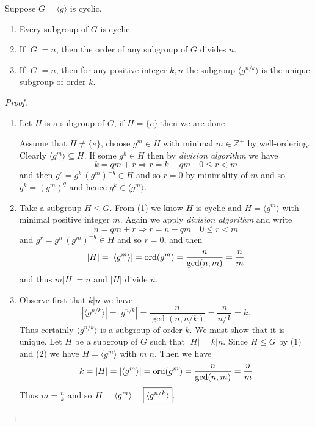 \begin{theorem}
    Suppose $G = \langle g \rangle$ is cyclic.
    \begin{enumerate}
        \item Every subgroup of $G$ is cyclic.
        \item If $|G|=n$, then the order of any subgroup of $G$ divides $n$.
        \item If $|G|=n$, then for any positive integer $k,n$ the subgroup $\langle g^{n/k} \rangle$ 
        is the unique subgroup of order $k$.
    \end{enumerate}
\end{theorem}
\begin{proof}
    \begin{enumerate}
        \item Let $H$ is a subgroup of $G$, if $H = \{ e \}$ then we are done. 
        
        Assume that $H \neq \{ e\}$, choose $g^m \in H$ with minimal $m \in \mathbb{Z}^+$ by well-ordering.
        Clearly $\langle g^m \rangle \subseteq H$. If some $g^k \in H$ then by \textit{division algorithm} we have 
        \[
            k = qm + r \Longrightarrow r = k - qm \quad 0 \leq r < m
        \] 
        and then $g^r = g^k\, (g^m)^{-q} \in H$ and so $r = 0$ by minimality of $m$ and so 
        $g^k = (g^m)^q$ and hence $g^k \in \langle g^m \rangle$.

        \item Take a subgroup $H \leq G$. From (1) we know $H$ is cyclic and $H =\langle g^m \rangle$ with minimal positive integer $m$.
        Again we apply \textit{division algorithm} and write 
        \[
            n = qm + r \Longrightarrow r = n - qm \quad 0 \leq r < m
        \]
        and $g^r = g^n\, (g^m)^{-q} \in H$ and so $r = 0$, and then 
        \[
            |H| = |\langle g^m \rangle| = \operatorname{ord}(g^m) = \frac{n}{\gcd(n,m)} = \frac{n}{m}
        \]
        and thus $m|H| = n$ and $|H|$ divide $n$.

        \item Observe first that $k | n$ we have 
        \[
            |\langle g^{n/k} \rangle| = |g^{n/k}| = \frac{n}{\gcd(n, n/k)} = \frac{n}{n/k} = k.
        \]
        Thus certainly $\langle g^{n/k} \rangle$ is a subgroup of order $k$. We must show that it is unique. Let 
        $H$ be a subgroup of $G$ such that $|H| = k | n$. Since $H \leq G$ by (1) and (2) we have $H =\langle g^m \rangle$ 
        with $m|n$. Then we have 
        \[
            k = |H| = |\langle g^m \rangle| = \operatorname{ord}(g^m) = \frac{n}{\gcd(n,m)} = \frac{n}{m}
        \]
        Thus $m = \frac{n}{k}$ and so $H = \langle g^m \rangle = \fbox{$\langle g^{n/k} \rangle$}$. 
    \end{enumerate}
\end{proof}

